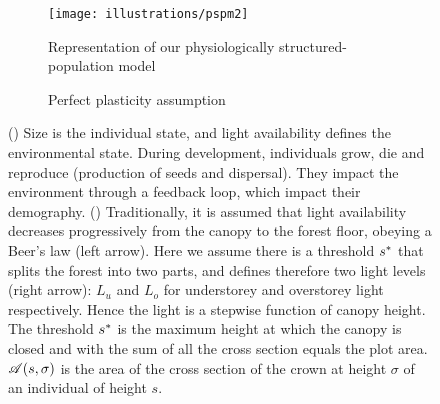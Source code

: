 \begin{figure}
\centering
\begin{subfigure}[b]{0.95\textwidth}
   \texttt{[image: illustrations/pspm2]}
   \caption{Representation of our physiologically structured-population model}
   \label{fig::pspm}
\end{subfigure}
\par\bigskip
\begin{subfigure}[b]{0.95\textwidth}
   \centering
   
   \caption{Perfect plasticity assumption}
   \label{fig::ppa}
\end{subfigure}
\caption{() Size is the individual state, and light availability defines the
environmental state. During development, individuals grow, die and reproduce
(production of seeds and dispersal). They impact the environment through a
feedback loop, which impact their demography. () Traditionally, it is assumed
that light availability decreases progressively from the canopy to the forest
floor, obeying a Beer's law (left arrow). Here we assume there is a threshold $ {s}^{*} $ that
splits the forest into two parts, and defines therefore two light levels (right arrow): $
L_u $ and $ L_o $ for understorey and overstorey light respectively. Hence the
light is a stepwise function of canopy height. The threshold $ {s}^{*} $ is the maximum
height at which the canopy is closed and with the sum of all the cross section equals the plot area. $ \mathscr{A}(s, \sigma) $ is the area of the cross section of the crown at height $ \sigma $ of an individual of height $ s $. \label{fig::pspm_ppa}}
\end{figure}

